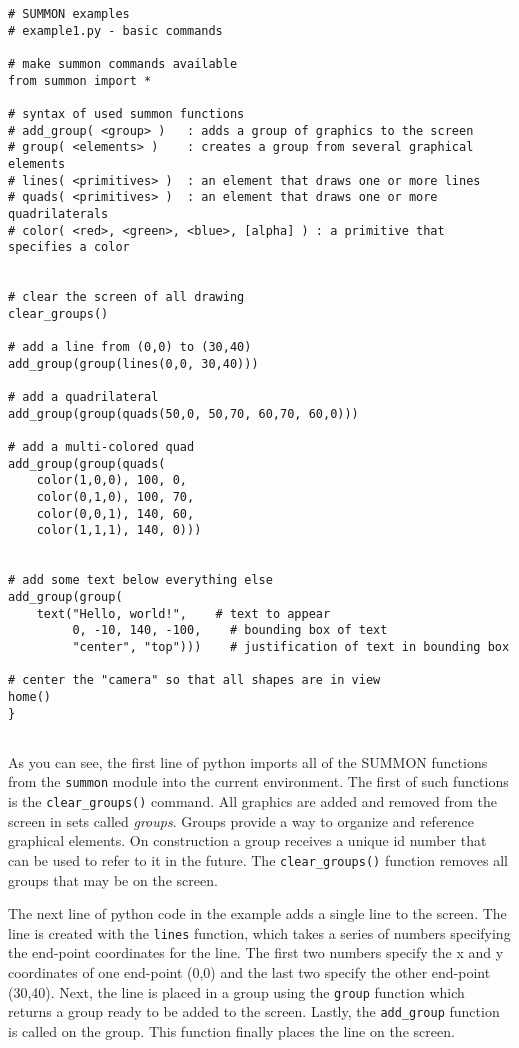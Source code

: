 \documentclass[12pt]{article}
\newcommand{\code}[1]{{\tt #1}}
\begin{document}
{\small
\begin{verbatim}
# SUMMON examples
# example1.py - basic commands

# make summon commands available
from summon import *

# syntax of used summon functions
# add_group( <group> )   : adds a group of graphics to the screen
# group( <elements> )    : creates a group from several graphical elements
# lines( <primitives> )  : an element that draws one or more lines
# quads( <primitives> )  : an element that draws one or more quadrilaterals
# color( <red>, <green>, <blue>, [alpha] ) : a primitive that specifies a color


# clear the screen of all drawing
clear_groups()

# add a line from (0,0) to (30,40)
add_group(group(lines(0,0, 30,40)))

# add a quadrilateral
add_group(group(quads(50,0, 50,70, 60,70, 60,0)))

# add a multi-colored quad
add_group(group(quads(
    color(1,0,0), 100, 0,
    color(0,1,0), 100, 70,
    color(0,0,1), 140, 60,
    color(1,1,1), 140, 0)))


# add some text below everything else
add_group(group(
    text("Hello, world!",    # text to appear
         0, -10, 140, -100,    # bounding box of text
         "center", "top")))    # justification of text in bounding box

# center the "camera" so that all shapes are in view
home()
}


\end{verbatim}
}

As you can see, the first line of python imports all of the SUMMON functions
from the \code{summon} module into the current environment.  The first of such
functions is the \code{clear\_groups()} command.  All graphics are added and
removed from the screen in sets called {\em groups}.  Groups provide a way to
organize and reference graphical elements.  On construction a group receives a
unique id number that can be used to refer to it in the future.  The
\code{clear\_groups()} function removes all groups that may be on the screen.

The next line of python code in the example adds a single line to the screen. 
The line is created with the \code{lines} function, which takes a series of
numbers specifying the end-point coordinates for the line.  The first
two numbers specify the x and y coordinates of one end-point (0,0) and the last
two specify the other end-point (30,40).  Next, the line is placed in a group
using the \code{group} function which returns a group ready to be added to the
screen.   Lastly, the \code{add\_group} function is called on the group.  This
function finally places the line on the screen.
\end{document}
